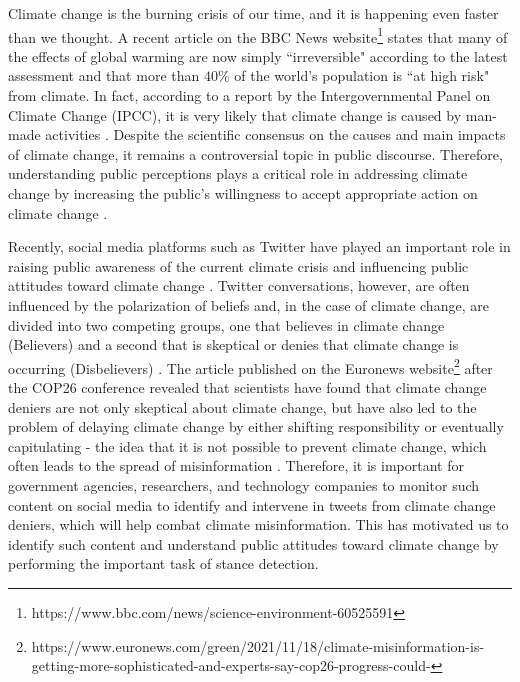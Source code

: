 \documentclass[letterpaper]{article}
\begin{document}
Climate change is the burning crisis of our time, and it is happening even faster than we thought. A recent article on the BBC News website\footnote{https://www.bbc.com/news/science-environment-60525591} states that many of the effects of global warming are now simply ``irreversible" according to the latest assessment and that more than $40$\% of the world's population is ``at high risk" from climate.
In fact, according to a report by the Intergovernmental Panel on Climate Change (IPCC), it is very likely that climate change is caused by man-made activities \cite{myhre2013climate}. Despite the scientific consensus on the causes and main impacts of climate change, it remains a controversial topic in public discourse. Therefore, understanding public perceptions plays a critical role in addressing climate change by increasing the public's willingness to accept appropriate action on climate change \cite{shi2015public}.
\par\noindent Recently, social media platforms such as Twitter have played an important role in raising public awareness of the current climate crisis and influencing public attitudes toward climate change \cite{lineman2015talking}. Twitter conversations, however, are often influenced by the polarization of beliefs and, in the case of climate change, are divided into two competing groups, one that believes in climate change (Believers) and a second that is skeptical or denies that climate change is occurring (Disbelievers) \cite{jang2015polarized, cann2021ideological}. The article published on the Euronews website\footnote{https://www.euronews.com/green/2021/11/18/climate-misinformation-is-getting-more-sophisticated-and-experts-say-cop26-progress-could-} after the COP26 conference revealed that scientists have found that climate change deniers are not only skeptical about climate change, but have also led to the problem of delaying climate change by either shifting responsibility or eventually capitulating - the idea that it is not possible to prevent climate change, which often leads to the spread of misinformation \cite{zhou2021confirmation}. Therefore, it is important for government agencies, researchers, and technology companies to monitor such content on social media to identify and intervene in tweets from climate change deniers, which will help combat climate misinformation. This has motivated us to identify such content and understand public attitudes toward climate change by performing the important task of stance detection.
\end{document}
